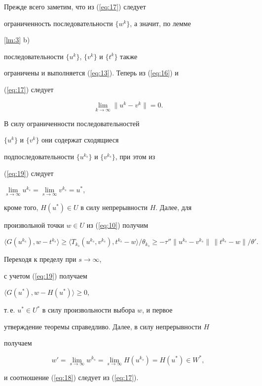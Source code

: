 \begin{pf}


Прежде всего заметим, что из (\ref{eq:17}) следует 


ограниченность последовательности $\{ w^{k} \}$, а значит, по лемме


\ref{lm:3} b)


последовательности $\{ u^{k} \}$, $\{ v^{k}\}$ и $\{ t^{k} \}$ также 


ограничены и выполняется (\ref{eq:13}). Теперь из (\ref{eq:16}) и 


(\ref{eq:17}) следует


\begin{equation} \label{eq:19} 


\lim_{k \to \infty} \| u^{k} - v^{k} \|=0.


\end{equation}


В силу ограниченности последовательностей


$\{ u^{k} \}$ и $\{ v^{k} \}$ они содержат сходящиеся 


подпоследовательности $\{ u^{k_{s} } \}$ и $\{ v^{k_{s} }\}$, при этом из 


(\ref{eq:19}) следует


$\lim\limits_{s \to \infty} u^{k_{s} }=


\lim\limits_{s \to \infty} v^{k_{s} }=u^{*}$,


кроме того, $H(u^{*}) \in U$ в силу непрерывности $H$. Далее, для 


произвольной точки $w \in U$ из (\ref{eq:10}) получим


$$


\langle G(u^{k_{s} }), w - t^{k_{s} } \rangle 


\geq \langle T_{k_{s} }(u^{k_{s} }, v^{k_{s} }),


t^{k_{s} } - w \rangle / \theta_{k_{s} } 


\geq - \tau '' \| u^{k_{s} } - v^{k_{s} } \|\,\|t^{k_{s} }-w \| / \theta'. 


$$


Переходя к пределу при $s \rightarrow \infty $, 


с учетом (\ref{eq:19}) получаем


$\langle G(u^{*}), w - H(u^{*}) \rangle \geq 0$,


т.\,е. $u^{*} \in U^{*}$ в силу произвольности выбора $w$, и первое 


утверждение теоремы справедливо. Далее, в силу непрерывности $H$ 


получаем


$$


w'=\lim_{s \to \infty} w^{k_{s} }=\lim_{s \rightarrow \infty} H(u^{k_{s} })=


H(u^{*}) \in W^{*},


$$


и соотношение (\ref{eq:18}) следует из (\ref{eq:17}).


\end{pf}





